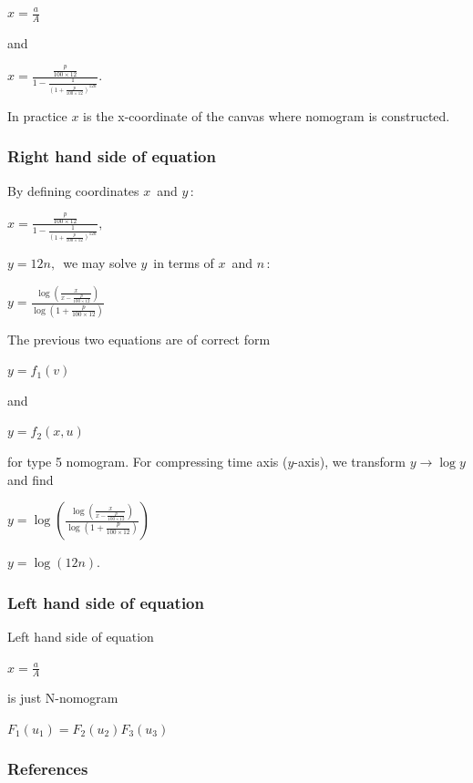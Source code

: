 \documentclass[a4paper,11pt,english]{sphinxmanual}
\begin{document}
\(x = \frac{a}{A}\)

and

\(x = \frac{\frac{p}{100\times 12}}{1-\frac{1}{(1+\frac{p}{100\times 12})^{12n}}}.\)

In practice \(x\) is the x-coordinate of the canvas where nomogram
is constructed.


\subsubsection{Right hand side of equation}
\label{examples/examples:right-hand-side-of-equation}
By defining coordinates \(x\,\) and \(y\,\):

\(x = \frac{\frac{p}{100\times 12}}{1-\frac{1}{(1+\frac{p}{100\times 12})^{12n}}},\)

\(y = 12n, \,\) we may solve \(y\,\) in terms of \(x\,\) and
\(n\,\):

\(y = \frac{\log (\frac{x}{x-\frac{p}{100\times 12}})}{\log (1+\frac{p}{100 \times 12})} \,\)

The previous two equations are of correct form

\(y = f_1(v) \,\)

and

\(y = f_2(x,u) \,\)

for type 5 nomogram. For compressing time axis (\(y\)-axis), we
transform \(y \rightarrow \log y\) and find

\(y = \log \left( \frac{\log (\frac{x}{x-\frac{p}{100\times 12}})}{\log (1+\frac{p}{100 \times 12})} \right)\,\)

\(y = \log( 12n ). \,\)


\subsubsection{Left hand side of equation}
\label{examples/examples:left-hand-side-of-equation}
Left hand side of equation

\(x = \frac{a}{A}\)

is just N-nomogram

\(F_1(u_1) = F_2(u_2)F_3(u_3) \,\)


\subsubsection{References}
\label{examples/examples:references}
\end{document}
